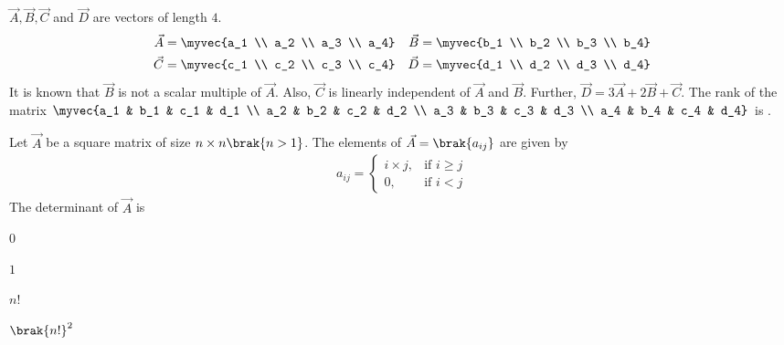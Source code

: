 \item $\vec{A}, \vec{B}, \vec{C}$ and $\vec{D}$ are vectors of length $4$.
\begin{align*}
\vec{A} &= \myvec{a_1 \\ a_2 \\ a_3 \\ a_4} &
\vec{B} &= \myvec{b_1 \\ b_2 \\ b_3 \\ b_4} \\
\vec{C} &= \myvec{c_1 \\ c_2 \\ c_3 \\ c_4} &
\vec{D} &= \myvec{d_1 \\ d_2 \\ d_3 \\ d_4}
\end{align*}
It is known that $\vec{B}$ is not a scalar multiple of $\vec{A}$. Also, $\vec{C}$ is linearly independent of $\vec{A}$ and $\vec{B}$. Further, $\vec{D} = 3\vec{A} + 2\vec{B} + \vec{C}$. The rank of the matrix $\myvec{a_1 & b_1 & c_1 & d_1 \\ a_2 & b_2 & c_2 & d_2 \\ a_3 & b_3 & c_3 & d_3 \\ a_4 & b_4 & c_4 & d_4}$ is \underline{\hspace{2cm}}.
\hfill{}
\item Let $\vec{A}$ be a square matrix of size $n \times n \brak{n > 1}$. The elements of $\vec{A} = \brak{a_{ij}}$ are given by
\begin{align*}
	a_{ij} = \begin{cases}
		i \times j, & \text{if } i \ge j \\
		0, & \text{if } i < j
	\end{cases}
\end{align*}
The determinant of $\vec{A}$ is
\hfill{}
\begin{enumerate}
	\begin{multicols}{4}
		\item $0$
		\item $1$
		\item $n!$
		\item $\brak{n!}^{2}$
	\end{multicols}
\end{enumerate}

